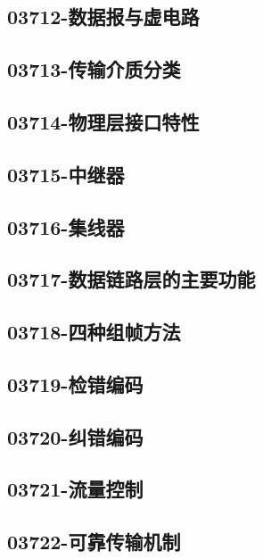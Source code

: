 \subsection{03712-数据报与虚电路}

\subsection{03713-传输介质分类}

\subsection{03714-物理层接口特性}

\subsection{03715-中继器}

\subsection{03716-集线器}

\subsection{03717-数据链路层的主要功能}

\subsection{03718-四种组帧方法}

\subsection{03719-检错编码}

\subsection{03720-纠错编码}

\subsection{03721-流量控制}

\subsection{03722-可靠传输机制}


